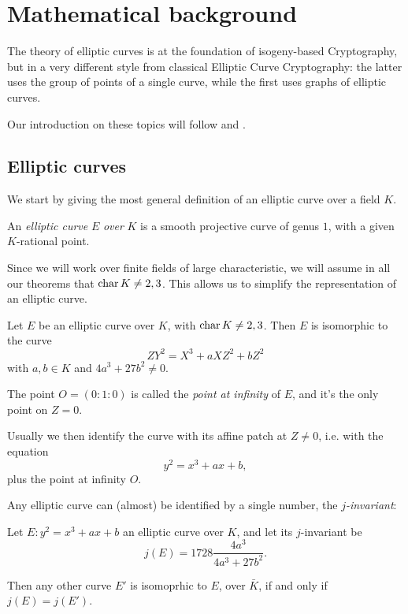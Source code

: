 \chapter{Mathematical background}

The theory of elliptic curves is at the foundation of isogeny-based Cryptography, but in a very different style from classical Elliptic Curve Cryptography: the latter uses the group of points of a single curve, while the first uses graphs of elliptic curves.

Our introduction on these topics will follow \cite{Silverman} and \cite{DeFeo_intro}.

\section{Elliptic curves}

We start by giving the most general definition of an elliptic curve over a field $K$.

\begin{definition}
    An \emph{elliptic curve} $E$ \emph{over} $K$ is a smooth projective curve of genus $1$, with a given $K$-rational point.
\end{definition}

Since we will work over finite fields of large characteristic, we will assume in all our theorems that $\operatorname{char} K\neq 2,3$. This allows us to simplify the representation of an elliptic curve.

\begin{proposition}
    Let $E$ be an elliptic curve over $K$, with $\operatorname{char} K\neq 2,3$. Then $E$ is isomorphic to the curve $$ZY^2=X^3+aXZ^2+bZ^2$$ with $a,b\in K$ and $4a^3+27b^2\neq0$.
    
    The point $O=(0:1:0)$ is called the \emph{point at infinity} of $E$, and it's the only point on $Z=0$.
\end{proposition}

Usually we then identify the curve with its affine patch at $Z\neq0$, i.e. with the equation $$y^2=x^3+ax+b,$$
plus the point at infinity $O$.

Any elliptic curve can (almost) be identified by a single number, the \emph{$j$-invariant}:
\begin{theorem}
    Let $E:y^2=x^3+ax+b$ an elliptic curve over $K$, and let its $j$-invariant be $$j(E)=1728\frac{4a^3}{4a^3+27b^2}.$$
    
    Then any other curve $E'$ is isomoprhic to $E$, over $\bar K$, if and only if $j(E)=j(E')$.
\end{theorem}

